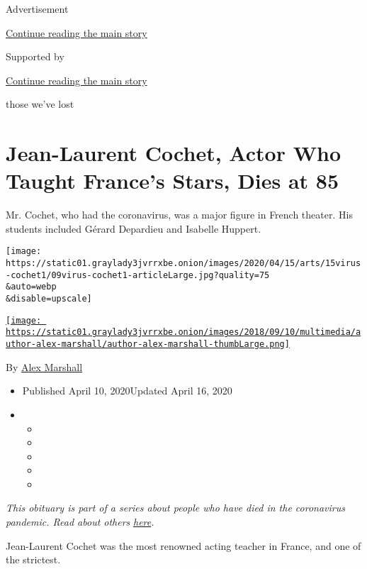Advertisement

\protect\hyperlink{after-top}{Continue reading the main story}

Supported by

\protect\hyperlink{after-sponsor}{Continue reading the main story}

those we've lost

\hypertarget{jean-laurent-cochet-actor-who-taught-frances-stars-dies-at-85}{%
\section{Jean-Laurent Cochet, Actor Who Taught France's Stars, Dies at
85}\label{jean-laurent-cochet-actor-who-taught-frances-stars-dies-at-85}}

Mr. Cochet, who had the coronavirus, was a major figure in French
theater. His students included Gérard Depardieu and Isabelle Huppert.

\texttt{[image: https://static01.graylady3jvrrxbe.onion/images/2020/04/15/arts/15virus-cochet1/09virus-cochet1-articleLarge.jpg?quality=75\\\&auto=webp\\\&disable=upscale]}

\href{https://www.nytimes3xbfgragh.onion/by/alex-marshall}{\texttt{[image: https://static01.graylady3jvrrxbe.onion/images/2018/09/10/multimedia/author-alex-marshall/author-alex-marshall-thumbLarge.png]}}

By \href{https://www.nytimes3xbfgragh.onion/by/alex-marshall}{Alex
Marshall}

\begin{itemize}
\item
  Published April 10, 2020Updated April 16, 2020
\item
  \begin{itemize}
  \item
  \item
  \item
  \item
  \item
  \end{itemize}
\end{itemize}

\emph{This obituary is part of a series about people who have died in
the coronavirus pandemic. Read about others}
\href{https://www.nytimes3xbfgragh.onion/series/people-who-have-died-of-the-coronavirus}{\emph{here}}\emph{.}

Jean-Laurent Cochet was the most renowned acting teacher in France, and
one of the strictest.

